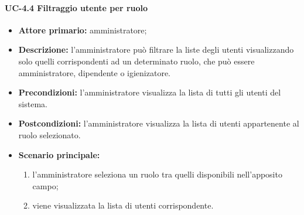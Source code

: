     \paragraph{UC-4.4 Filtraggio utente per ruolo}
    \begin{itemize}
        \item \textbf{Attore primario:} amministratore; 
    
        \item \textbf{Descrizione:} l'amministratore può filtrare la liste degli utenti visualizzando solo quelli corrispondenti ad un determinato ruolo, che può essere amministratore, dipendente o igienizatore.
    
        \item \textbf{Precondizioni:} l'amministratore visualizza la lista di tutti gli utenti del sistema.
    
        \item \textbf{Postcondizioni:} l'amministratore visualizza la lista di utenti appartenente al ruolo selezionato.
    
        \item \textbf{Scenario principale:}
              \begin{enumerate}
                  \item l'amministratore seleziona un ruolo tra quelli disponibili nell'apposito campo;
                  \item viene visualizzata la lista di utenti corrispondente.
              \end{enumerate}
    \end{itemize}

